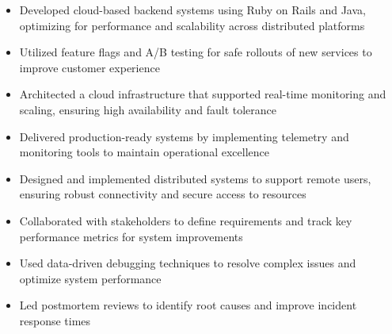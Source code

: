 \par\smallskip
\begin{minipage}{13.75cm}
  \begin{minipage}{6.5cm}
    \begin{itemize}
      \item Developed cloud-based backend systems using Ruby on Rails and Java, optimizing for performance and scalability across distributed platforms
      \item Utilized feature flags and A/B testing for safe rollouts of new services to improve customer experience
    \end{itemize}
  \end{minipage}
  \hfill
  \begin{minipage}{6.5cm}
    \begin{itemize}
      \item Architected a cloud infrastructure that supported real-time monitoring and scaling, ensuring high availability and fault tolerance
      \item Delivered production-ready systems by implementing telemetry and monitoring tools to maintain operational excellence
    \end{itemize}
  \end{minipage}
\end{minipage}
\par\smallskip
\divider

\par\smallskip
\begin{minipage}{13.75cm}
  \begin{minipage}{6.5cm}
    \begin{itemize}
      \item Designed and implemented distributed systems to support remote users, ensuring robust connectivity and secure access to resources
      \item Collaborated with stakeholders to define requirements and track key performance metrics for system improvements
    \end{itemize}
  \end{minipage}
  \hfill
  \begin{minipage}{6.5cm}
    \begin{itemize}
      \item Used data-driven debugging techniques to resolve complex issues and optimize system performance
      \item Led postmortem reviews to identify root causes and improve incident response times
    \end{itemize}
  \end{minipage}
\end{minipage}

